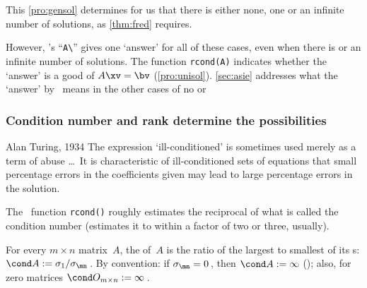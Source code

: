 This \cref{pro:gensol} determines for us that there is either none, one or an infinite number of solutions, as \cref{thm:fred} requires.

However,  \script's ``\verb|A\|'' gives one `answer' for all of these cases, even when there is  or an infinite number of solutions.
The function \verb|rcond(A)| indicates whether the `answer' is a good  of \(A\xv=\bv\) (\cref{pro:unisol}).
\cref{sec:asie} addresses what the `answer' by \script\ means in the other cases of no or 





\subsubsection{Condition number and rank determine the possibilities}

\begin{quoted}{Alan Turing, 1934 \cite[p.131]{Higham1996}}
The expression `ill-conditioned' is sometimes used merely as a term of abuse \ldots\ 
It is characteristic of ill-conditioned sets of equations that small percentage errors in the coefficients given may lead to large percentage errors in the solution.
\end{quoted}

The \script\ function \verb|rcond()| roughly estimates the reciprocal of what is called the condition number (estimates it to within a factor of two or three, usually).
\begin{comment}
Avoid introducing \verb|cond()| as it is expensive to compute in practice, and better learning to reinforce the ratio of singular values.
\end{comment}

\begin{definition} \label{def:condnum}
For every \(m\times n\) matrix~\(A\),
the  of~\(A\) is the ratio of the largest to smallest of its s: \(\cond A:=\sigma_1/\sigma_{\mn}\)\,. 
By convention: if \(\sigma_{\mn}=0\)\,, then \(\cond A:=\infty\) (\idx{infinity}); 
also, for zero matrices \(\cond O_{m\times n}:=\infty\)\,.
\end{definition}

